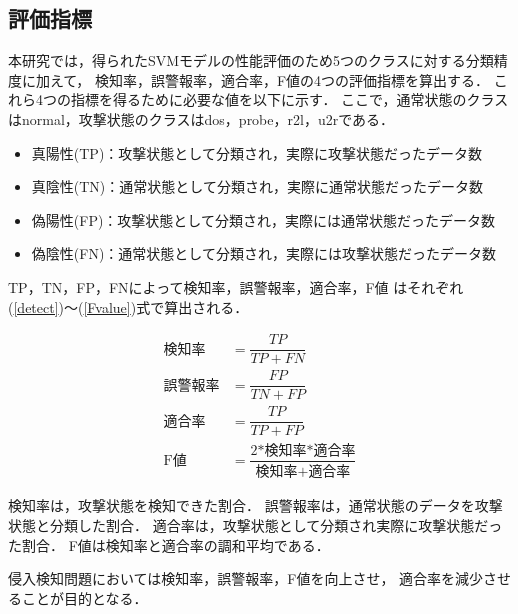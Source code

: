\subsection{評価指標}
本研究では，得られたSVMモデルの性能評価のため5つのクラスに対する分類精度に加えて，
検知率，誤警報率，適合率，F値の4つの評価指標を算出する．
これら4つの指標を得るために必要な値を以下に示す．
ここで，通常状態のクラスはnormal，攻撃状態のクラスはdos，probe，r2l，u2rである．
\begin{itemize}
    \item 真陽性(TP)：攻撃状態として分類され，実際に攻撃状態だったデータ数
    \item 真陰性(TN)：通常状態として分類され，実際に通常状態だったデータ数
    \item 偽陽性(FP)：攻撃状態として分類され，実際には通常状態だったデータ数
    \item 偽陰性(FN)：通常状態として分類され，実際には攻撃状態だったデータ数
\end{itemize}
TP，TN，FP，FNによって検知率，誤警報率，適合率，F値
はそれぞれ(\ref{detect})〜(\ref{Fvalue})式で算出される．

\setlength{\jot}{12pt}
\begin{align}
\text{検知率} &= \dfrac{TP}{TP + FN}\label{detect}\\
\text{誤警報率} &= \dfrac{FP}{TN + FP}\\
\text{適合率} &= \dfrac{TP}{TP + FP}\\
\text{F値} &= \dfrac{2\text{*検知率*適合率}}{\text{検知率}+\text{適合率}}\label{Fvalue}
\end{align}

検知率は，攻撃状態を検知できた割合．
誤警報率は，通常状態のデータを攻撃状態と分類した割合．
適合率は，攻撃状態として分類され実際に攻撃状態だった割合．
F値は検知率と適合率の調和平均である．

侵入検知問題においては検知率，誤警報率，F値を向上させ，
適合率を減少させることが目的となる．
